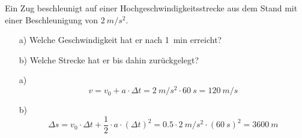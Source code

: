 
\begin{aufgabe}
Ein Zug beschleunigt auf einer Hochgeschwindigkeitsstrecke aus dem Stand
mit einer Beschleunigung von $\SI{2}{m/s^2}$.\\
\begin{itemize}
	\item[a)] Welche Geschwindigkeit hat er nach \SI{1}{min} erreicht?
	\item[b)] Welche Strecke hat er bis dahin zurückgelegt?
\end{itemize}


\begin{loesung}
\begin{itemize}
	\item[a)] \[v = v_0 + a \cdot \Delta t = \SI{2}{m/s^2}\cdot \SI{60}{s} = \SI{120}{m/s}\]
	\item[b)] \[\Delta s = v_0\cdot\Delta t + \frac{1}{2} \cdot a \cdot (\Delta t)^2 = 0.5 \cdot \SI{2}{m/s^2} \cdot (\SI{60}{s})^2 = \SI{3600}{m}\]
\end{itemize}
\end{loesung}
\end{aufgabe}
